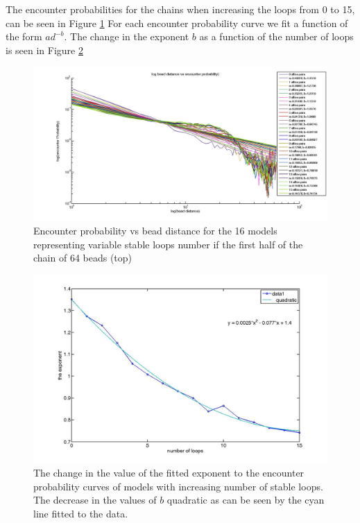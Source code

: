 \documentclass[12pt]{book}
\begin{document}
 The encounter probabilities for the chains when increasing the loops from 0 to 15, can be seen in Figure \ref{figure_logBeadDistanceVsEncounterProbabilityVariableLoops64Beads}
For each encounter probability curve we fit a function of the form $ad^{-b}$. The change in the exponent $b$ as a function of the number of loops is seen in Figure \ref{figure_changeOfExponentAsAfunctionOfLoopsStableLoopModelVariableLoops64Beads}

\begin{figure}[H]
\includegraphics[scale=0.2]{logBeadDistanceVsEncounterProbabilityVariableLoops64Beads}
\caption{\scriptsize{Encounter probability vs bead distance for the 16 models representing variable stable loops number if the first half of the chain of 64 beads (top)}}
\label{figure_logBeadDistanceVsEncounterProbabilityVariableLoops64Beads}
\end{figure}

\begin{figure}[H]
\includegraphics[scale=0.15]{changeOfExponentAsAfunctionOfLoopsStableLoopModelVariableLoops64Beads}
\caption{\scriptsize{The change in the value of the fitted exponent to the encounter probability curves of models with increasing number of stable loops. The decrease in the values of $b$ quadratic as can be seen by the cyan line fitted to the data.}}
\label{figure_changeOfExponentAsAfunctionOfLoopsStableLoopModelVariableLoops64Beads}
\end{figure}
\end{document}
